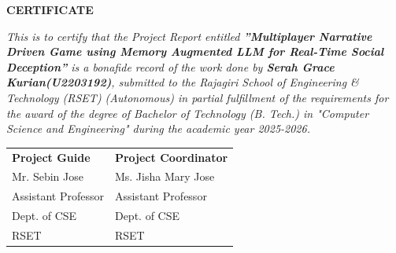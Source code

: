 	\newpage
	\thispagestyle{empty}
	\vspace{1cm}
	\begin{center}
	
		\large \bfseries{\huge{CERTIFICATE}}\\[1cm]
	\end{center}
	
	\renewcommand{\baselinestretch}{1.2}\normalsize
	
	\emph{This is to certify that the Project Report entitled \textbf{”Multiplayer Narrative Driven Game using Memory
Augmented LLM for Real-Time Social Deception”} is a bonafide record of the work done by 
\textbf{Serah Grace Kurian(U2203192)},
submitted to the Rajagiri School of Engineering \& Technology (RSET) (Autonomous) in partial fulfillment of the requirements for the award of the degree of Bachelor of Technology (B. Tech.) in "Computer Science and Engineering" during the academic year 2025-2026.}\\[2.5cm]
	
\begin{flushleft}
	
	
	\begin{longtable}{p{10.8cm} p{10.8cm}}
        {\textbf{Project Guide}} &  {\textbf{Project Coordinator}}\\
		{Mr. Sebin Jose} & {Ms. Jisha Mary Jose}\\
		{Assistant Professor} & {Assistant Professor}\\
		{Dept. of CSE} & {Dept. of CSE}\\
		{RSET} & {RSET} \\
		
	\end{longtable}
\end{flushleft}
	
